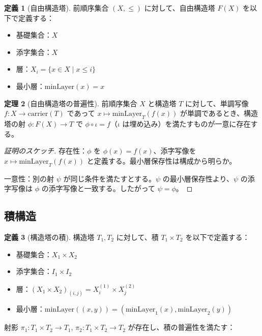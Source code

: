 \documentclass[a4paper,12pt]{article}
\theoremstyle{definition}
\newtheorem{definition}{定義}[section]
\newtheorem{theorem}[definition]{定理}
\begin{document}
\begin{definition}[自由構造塔]
前順序集合 $(X, \leq)$ に対して、自由構造塔 $F(X)$ を以下で定義する：
\begin{itemize}
\item 基礎集合：$X$
\item 添字集合：$X$
\item 層：$X_i = \{x \in X \mid x \leq i\}$
\item 最小層：$\text{minLayer}(x) = x$
\end{itemize}
\end{definition}

\begin{theorem}[自由構造塔の普遍性]\label{thm:free-tower-universal}
前順序集合 $X$ と構造塔 $T$ に対して、単調写像 $f : X \to \text{carrier}(T)$ であって $x \mapsto \text{minLayer}_T(f(x))$ が単調であるとき、構造塔の射 $\phi : F(X) \to T$ で $\phi \circ \iota = f$（$\iota$ は埋め込み）を満たすものが一意に存在する。
\end{theorem}

\begin{proof}[証明のスケッチ]
存在性：$\phi$ を $\phi(x) = f(x)$、添字写像を $x \mapsto \text{minLayer}_T(f(x))$ と定義する。最小層保存性は構成から明らか。

一意性：別の射 $\psi$ が同じ条件を満たすとする。$\psi$ の最小層保存性より、$\psi$ の添字写像は $\phi$ の添字写像と一致する。したがって $\psi = \phi$。
\end{proof}

\subsection{積構造}

\begin{definition}[構造塔の積]
構造塔 $T_1, T_2$ に対して、積 $T_1 \times T_2$ を以下で定義する：
\begin{itemize}
\item 基礎集合：$X_1 \times X_2$
\item 添字集合：$I_1 \times I_2$
\item 層：$(X_1 \times X_2)_{(i,j)} = X_i^{(1)} \times X_j^{(2)}$
\item 最小層：$\text{minLayer}((x,y)) = (\text{minLayer}_1(x), \text{minLayer}_2(y))$
\end{itemize}
\end{definition}

射影 $\pi_1 : T_1 \times T_2 \to T_1$, $\pi_2 : T_1 \times T_2 \to T_2$ が存在し、積の普遍性を満たす：
\end{document}
